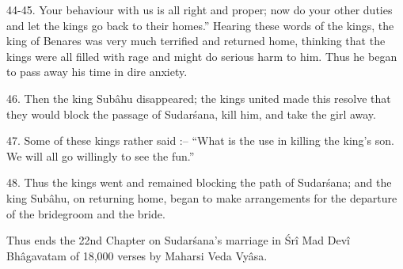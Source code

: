 44-45. Your behaviour with us is all right and proper; now do your other duties and let the kings go back to their homes.'' Hearing these words of the kings, the king of Benares was very much terrified and returned home, thinking that the kings were all filled with rage and might do serious harm to him. Thus he began to pass away his time in dire anxiety.

46. Then the king Sub\^ahu disappeared; the kings united made this resolve that they would block the passage of Sudar\'sana, kill him, and take the girl away.

47. Some of these kings rather said :-- ``What is the use in killing the king's son. We will all go willingly to see the fun.''

48. Thus the kings went and remained blocking the path of Sudar\'sana; and the king Sub\^ahu, on returning home, began to make arrangements for the departure of the bridegroom and the bride.

Thus ends the 22nd Chapter on Sudar\'sana's marriage in \'Sr\^i Mad Dev\^i Bh\^agavatam of 18,000 verses by Maharsi Veda Vy\^asa.